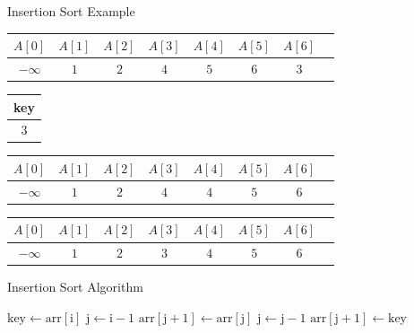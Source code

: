 \begin{frame}{Insertion Sort Example}
\vspace{1cm}
\begin{tabular}{|c|c|c|c|c|c|c|c|}
\hline
$A[0]$ & $A[1]$ & $A[2]$ & $A[3]$ & $A[4]$ & $A[5]$ & $A[6]$\\
\hline
$-\infty$ & $1$ & $2$ &\cellcolor{yellow} $4$ &\cellcolor{yellow} $5$ &\cellcolor{yellow} $6$ &\cellcolor{orange} $3$ \\
\hline
\end{tabular}
\vspace{1cm}
\begin{table}[!hbt]
\begin{tabular}{|c|}
\hline key\\
\hline $3$\\
\hline
\end{tabular}\hspace{1cm}
%
\begin{tabular}{|c|c|c|c|c|c|c|c|}
\hline
$A[0]$ & $A[1]$ & $A[2]$ & $A[3]$ & $A[4]$ & $A[5]$ & $A[6]$\\
\hline
$-\infty$ & $1$ & $2$ & $4$ & $4$ & $5$ &  \cellcolor{orange}$6$ \\
\hline
\end{tabular}
\end{table}


\begin{tabular}{|c|c|c|c|c|c|c|c|}
\hline
$A[0]$ & $A[1]$ & $A[2]$ & $A[3]$ & $A[4]$ & $A[5]$ & $A[6]$\\
\hline
$-\infty$ & \cellcolor{statalegreen}$1$ & \cellcolor{statalegreen}$2$ &\cellcolor{statalegreen}$3$&\cellcolor{statalegreen} $4$ & \cellcolor{statalegreen}$5$ & \cellcolor{statalegreen}$6$  \\
\hline
\end{tabular}

\end{frame}

\begin{frame}{Insertion Sort Algorithm}
    
    \begin{algorithm}[H]
        \caption{Insertion Sort}
        \begin{algorithmic}[1]
                    \State $\text{key} \gets \text{arr}[\text{i}]$
                    \State $\text{j} \gets \text{i} - 1$
                        \State $\text{arr}[\text{j} + 1] \gets \text{arr}[\text{j}]$
                        \State $\text{j} \gets \text{j} - 1$
                    \EndWhile
                    \State $\text{arr}[\text{j} + 1] \gets \text{key}$
                \EndFor
            \EndProcedure
        \end{algorithmic}
    \end{algorithm}
\end{frame}

